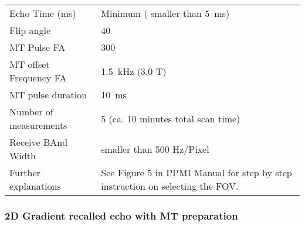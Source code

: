 \begin{tabularx}{\linewidth}{@{} s | X @{}}
Echo Time (ms)                                                                        & Minimum ( smaller than \SI{5}{\milli\second})                                          \\
Flip angle                                                                                 	& 40                                          \\
MT Pulse FA									& 300 					\\
MT offset Frequency FA						& \SI{1.5}{\kilo\hertz} (3.0 T)\\
MT pulse duration 								& \SI{10}{\milli\second}\\
Number of measurements                                                  & 5 (ca. 10 minutes total scan time)                 \\
Receive BAnd Width 							& smaller than 500 Hz/Pixel 	\\
Further explanations                                                             & See Figure 5 in PPMI Manual for step by step instruction on selecting the FOV.\\
\bottomrule
\end{tabularx}

\subsubsection{2D Gradient recalled echo with MT preparation}


